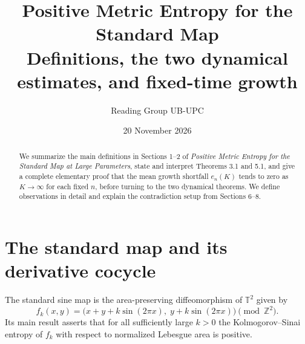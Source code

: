 \documentclass[11pt,a4paper]{article}
\title{\vspace{-1.4em}\textbf{Positive Metric Entropy for the Standard Map}\\[4pt]
\large Definitions, the two dynamical estimates, and fixed-time growth}
\author{Reading Group UB-UPC}
\date{20 November 2026}
\newcommand{\T}{\mathbb{T}}
\newcommand{\Z}{\mathbb{Z}}
\begin{document}
\maketitle
\vspace{-1.2em}

\begin{abstract}
\noindent
We summarize the main definitions in Sections 1--2 of \emph{Positive Metric Entropy for the Standard Map at Large Parameters}, state and interpret Theorems 3.1 and 5.1, and give a complete elementary proof that the mean growth shortfall $e_n(K)$ tends to zero as $K\to\infty$ for each fixed $n$, before turning to the two dynamical theorems. We define observations in detail and explain the contradiction setup from Sections 6--8.
\end{abstract}

\section{The standard map and its derivative cocycle}

The standard sine map is the area-preserving diffeomorphism of $\T^2$ given by
\begin{equation}\label{eq:map}
 f_k(x,y)=\bigl(x+y+k\sin(2\pi x),\;y+k\sin(2\pi x)\bigr)\pmod{\Z^2}.
\end{equation}
Its main result asserts that for all sufficiently large $k>0$ the Kolmogorov--Sinai entropy of $f_k$ with respect to normalized Lebesgue area is positive.
\end{document}
